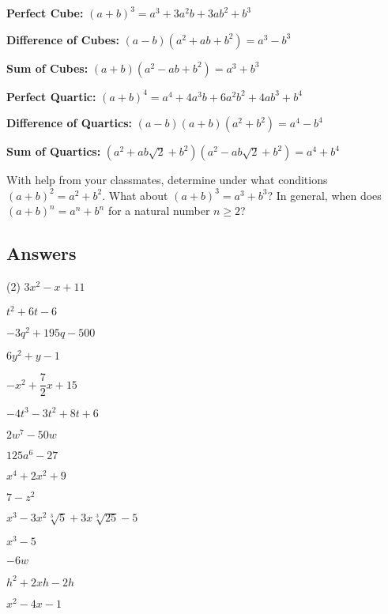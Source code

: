 \begin{tasks}[resume]
\task \textbf{Perfect Cube:} $(a+b)^3 = a^3 + 3a^2b + 3ab^2 + b^3$ \label{specialformexfirst}

\task \textbf{Difference of Cubes:} $(a - b)(a^2 + ab + b^2) = a^3 - b^3$

\task \textbf{Sum of Cubes:} $(a + b)(a^2 - ab + b^2) = a^3 + b^3$

\task \textbf{Perfect Quartic:} $(a+b)^4 = a^4 + 4a^3b + 6a^2b^2 + 4ab^3 + b^4$

\task \textbf{Difference of Quartics:} $(a-b)(a+b)(a^2+b^2) = a^4 - b^4$

\task \textbf{Sum of Quartics:}  $(a^2 + ab \sqrt{2} + b^2)(a^2 - ab \sqrt{2} + b^2) = a^4 + b^4$ \label{specialformexlast}

\task With help from your classmates, determine under what conditions $(a+b)^2 = a^2 + b^2$.  What about $(a+b)^3 = a^3 + b^3$? In general, when does $(a+b)^n = a^n + b^n$ for a natural number $n \geq 2$?

\end{tasks}

\clearpage

\subsection{Answers}

\begin{tasks}(2)
\task $3x^2 - x + 11$

\task $t^2 + 6t-6$

\task $-3q^2+195q-500$

\task $6y^2+y-1$

\task $-x^2 + \dfrac{7}{2} x + 15$

\task $-4t^3-3t^2+8t+6$

\task $2w^7 - 50w$

\task $125a^6 - 27$

\task $x^4+2x^2+9$

\task $7-z^2$

\task $x^3 - 3x^2\sqrt[3]{5} + 3x\sqrt[3]{25} - 5$

\task $x^3 - 5$

\task $-6w$

\task $h^2 + 2xh - 2h$

\task $x^2 - 4x - 1$ 

\end{tasks}

